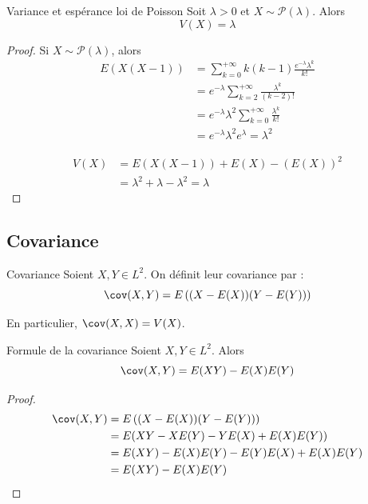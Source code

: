 \begin{proposition}{Variance et espérance loi de Poisson}{}
    Soit $\lambda > 0$ et $X \sim \mathcal P(\lambda)$. Alors 
    $$ V(X) = \lambda $$
\end{proposition}

\begin{proof}
    Si $X \sim \mathcal P(\lambda)$, alors 
    \begin{align}
        E(X(X - 1)) & = \sum_{k = 0}^{+ \infty} k (k - 1) \frac{e^{- \lambda} \lambda^k}{k!} \\
        & = e^{- \lambda} \sum_{k = 2}^{+ \infty} \frac{\lambda^k}{(k - 2)!} \\
        & = e^{- \lambda} \lambda^2 \sum_{k = 0}^{+ \infty} \frac{\lambda^k}{k!} \\
        & = e^{- \lambda} \lambda^2 e^{\lambda} = \lambda^2
    \end{align}

    \begin{align}
        V(X) & = E(X(X - 1)) + E(X) - (E(X))^2 \\
        & = \lambda^2 + \lambda - \lambda^2 = \lambda
    \end{align}
\end{proof}

\subsection{Covariance }

\begin{definition}{Covariance}{}
    Soient $X, Y \in L^2$. On définit leur covariance par : 
    $$ \cov(X, Y) = E\left( (X - E(X))(Y - E(Y)) \right) $$

    En particulier, $\cov(X, X) = V(X)$.
\end{definition}

\begin{proposition}{Formule de la covariance}{}
    Soient $X, Y \in L^2$. Alors 
    $$ \cov(X, Y) = E(XY) - E(X) E(Y) $$
\end{proposition}

\begin{proof}
    \begin{align}
        \cov(X, Y) & = E\left( (X - E(X))(Y - E(Y)) \right) \\
        & = E(XY - X E(Y) - Y E(X) + E(X) E(Y)) \\
        & = E(XY) - E(X) E(Y) - E(Y) E(X) + E(X) E(Y) \\
        & = E(XY) - E(X) E(Y)
    \end{align}
\end{proof}

